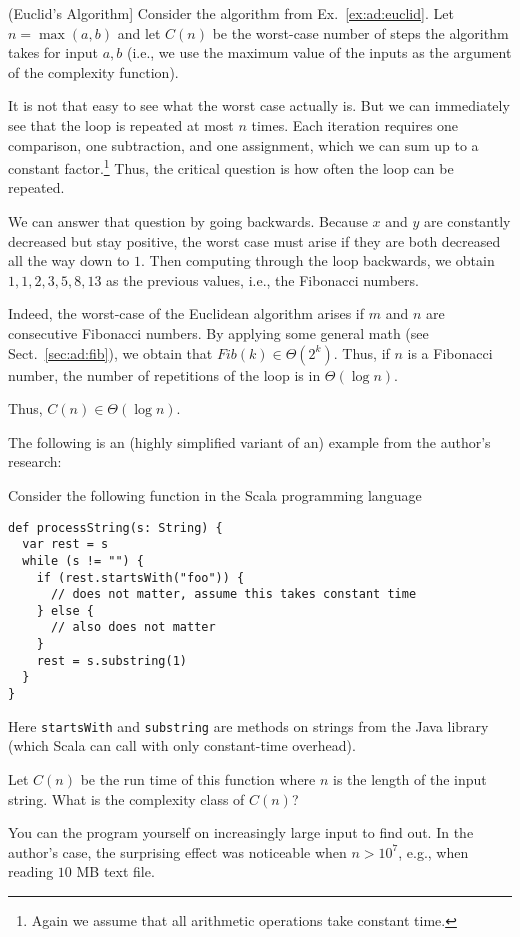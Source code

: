 \begin{example}(Euclid's Algorithm]\label{ex:ad:euclid:complex}
Consider the algorithm from Ex.~\ref{ex:ad:euclid}.
Let $n=\max(a,b)$ and let $C(n)$ be the worst-case number of steps the algorithm takes for input $a,b$ (i.e., we use the maximum value of the inputs as the argument of the complexity function).

It is not that easy to see what the worst case actually is.
But we can immediately see that the loop is repeated at most $n$ times.
Each iteration requires one comparison, one subtraction, and one assignment, which we can sum up to a constant factor.\footnote{Again we assume that all arithmetic operations take constant time.}
Thus, the critical question is how often the loop can be repeated.

We can answer that question by going backwards.
Because $x$ and $y$ are constantly decreased but stay positive, the worst case must arise if they are both decreased all the way down to $1$.
Then computing through the loop backwards, we obtain $1,1,2,3,5,8,13$ as the previous values, i.e., the Fibonacci numbers.

Indeed, the worst-case of the Euclidean algorithm arises if $m$ and $n$ are consecutive Fibonacci numbers.
By applying some general math (see Sect.~\ref{sec:ad:fib}), we obtain that $Fib(k)\in\Theta(2^k)$.
Thus, if $n$ is a Fibonacci number, the number of repetitions of the loop is in $\Theta(\log n)$.

Thus, $C(n)\in \Theta(\log n)$.
\end{example}

The following is an (highly simplified variant of an) example from the author's research:

\begin{example}\label{ex:ad:quadraticstringprocessor}
Consider the following function in the Scala programming language
\begin{lstlisting}
def processString(s: String) {
  var rest = s
  while (s != "") {
    if (rest.startsWith("foo")) {
      // does not matter, assume this takes constant time
    } else {
      // also does not matter
    }
    rest = s.substring(1)
  }
}
\end{lstlisting}
Here \lstinline|startsWith| and \lstinline|substring| are methods on strings from the Java library (which Scala can call with only constant-time overhead).

Let $C(n)$ be the run time of this function where $n$ is the length of the input string.
What is the complexity class of $C(n)$?

You can the program yourself on increasingly large input to find out.
In the author's case, the surprising effect was noticeable when $n>10^7$, e.g., when reading $10$ MB text file.
\end{example}

